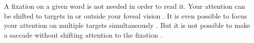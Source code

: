 A fixation on a given word is not needed in order to read it. Your attention can be shifted to targets in or outside your foveal vision \cite{eyeMovement}. It is even possible to focus your attention on multiple targets simultaneously \cite{simAttention}. But it is not possible to make a saccade without shifting attention to the fixation \cite{eyeMovement}.